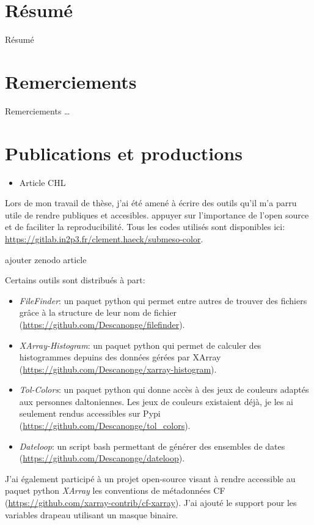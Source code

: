 \frontmatter

\section{Résumé}
Résumé

\clearpage
\section*{Remerciements}
Remerciements \dots

\clearpage
\section{Publications et productions}

\begin{itemize}
        \item Article CHL
\end{itemize}
\medskip

Lors de mon travail de thèse, j'ai été amené à écrire des outils qu'il m'a parru utile de rendre publiques et accesibles.
appuyer sur l'importance de l'open source et de faciliter la reproducibilité.
Tous les codes utilisés sont disponibles ici: \url{https://gitlab.in2p3.fr/clement.haeck/submeso-color}.

ajouter zenodo article
\medskip

Certains outils sont distribués à part:
\begin{itemize}
  \item \emph{FileFinder}: un paquet python qui permet entre autres de trouver des fichiers grâce à la structure de leur nom de fichier (\url{https://github.com/Descanonge/filefinder}).
  \item \emph{XArray-Histogram}: un paquet python qui permet de calculer des histogrammes depuins des données gérées par XArray (\url{https://github.com/Descanonge/xarray-histogram}).
  \item \emph{Tol-Colors}: un paquet python qui donne accès à des jeux de couleurs adaptés aux personnes daltoniennes. Les jeux de couleurs existaient déjà, je les ai seulement rendus accessibles sur Pypi (\url{https://github.com/Descanonge/tol_colors}).
  \item \emph{Dateloop}: un script bash permettant de générer des ensembles de dates (\url{https://github.com/Descanonge/dateloop}).
\end{itemize}
\medskip

J'ai également participé à un projet open-source visant à rendre accessible au paquet python \emph{XArray} les conventions de métadonnées CF (\url{https://github.com/xarray-contrib/cf-xarray}).
J'ai ajouté le support pour les variables drapeau utilisant un masque binaire.
